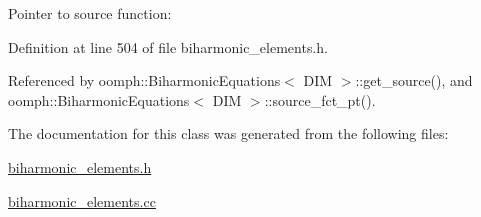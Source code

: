 Pointer to source function\+: 



Definition at line 504 of file biharmonic\+\_\+elements.\+h.



Referenced by oomph\+::\+Biharmonic\+Equations$<$ D\+I\+M $>$\+::get\+\_\+source(), and oomph\+::\+Biharmonic\+Equations$<$ D\+I\+M $>$\+::source\+\_\+fct\+\_\+pt().



The documentation for this class was generated from the following files\+:\begin{DoxyCompactItemize}
\item 
\hyperlink{biharmonic__elements_8h}{biharmonic\+\_\+elements.\+h}\item 
\hyperlink{biharmonic__elements_8cc}{biharmonic\+\_\+elements.\+cc}\end{DoxyCompactItemize}
